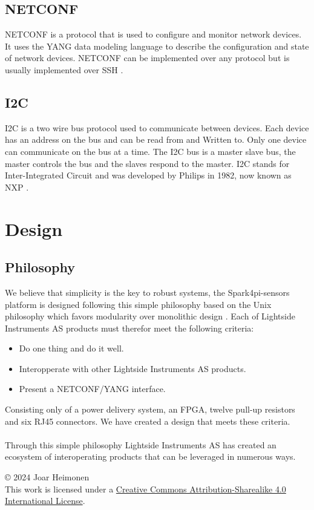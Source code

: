 \documentclass[12pt]{article}
\newcommand{\license}{
    \vspace{1em}
    \noindent\small{© 2024 Joar Heimonen\\
    This work is licensed under a \href{https://creativecommons.org/licenses/by-sa/4.0/}{Creative Commons Attribution-Sharealike 4.0 International License}.}
    \vspace{1em}
}
\begin{document}
\subsection{NETCONF}
NETCONF is a protocol that is used to configure and monitor network devices. It uses the YANG data modeling language to describe the configuration and state of network devices.
NETCONF can be implemented over any protocol but is usually implemented over SSH \cite{ennsNetworkConfigurationProtocol2011}.

\subsection{I2C}
I2C is a two wire bus protocol used to communicate between devices. Each device has an address on the bus and can be read from and Written to.
Only one device can communicate on the bus at a time. The I2C bus is a master slave bus, the master controls the bus and the slaves respond to the master.
I2C stands for Inter-Integrated Circuit and was developed by Philips in 1982, now known as NXP \cite{I2CbusSpecificationUser2021}.

\section{Design}
\subsection{Philosophy}
We believe that simplicity is the key to robust systems, the Spark4pi-sensors platform is designed following this simple philosophy based on the 
Unix philosophy which favors modularity over monolithic design \cite{BasicsUnixPhilosophy}.
Each of Lightside Instruments AS products must therefor meet the following criteria:
\begin{itemize}
    \item Do one thing and do it well.
    \item Interopperate with other Lightside Instruments AS products.
    \item Present a NETCONF/YANG interface.
\end{itemize}
Consisting only of a power delivery system, an FPGA, twelve pull-up resistors and six RJ45 connectors. We have 
created a design that meets these criteria.
\\
\\
Through this simple philosophy Lightside Instruments AS has created an ecosystem of interoperating products that can be
leveraged in numerous ways.


\pagebreak
{}
\printbibliography
\license
\end{document}
